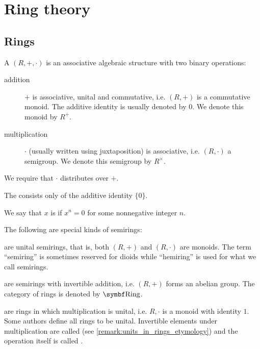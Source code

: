 \section{Ring theory}\label{sec:ring_theory}
\subsection{Rings}\label{subsec:rings}

\begin{definition}\label{def:semiring}
  A  \( (R, +, \cdot) \) is an associative algebraic structure with two binary operations:
  \begin{description}
    \item[addition] \( + \) is associative, unital and commutative, i.e. \( (R, +) \) is a commutative monoid. The additive identity is usually denoted by \( 0 \). We denote this monoid by \( R^+ \).

    \item[multiplication] \( \cdot \) (usually written using juxtaposition) is associative, i.e. \( (R, \cdot) \) a semigroup. We denote this semigroup by \( R^\times \).
  \end{description}

  We require that \( \cdot \) distributes over \( + \).

  The  consists only of the additive identity \( \{ 0 \} \).

  We say that \( x \) is  if \( x^n = 0 \) for some nonnegative integer \( n \).

  The following are special kinds of semirings:
  \begin{defenum}
      are unital semirings, that is, both \( (R, +) \) and \( (R, \cdot) \) are monoids. The term \enquote{semiring} is sometimes reserved for dioids while \enquote{hemiring} is used for what we call semirings.

      are semirings with invertible addition, i.e. \( (R, +) \) forms an abelian group. The category of rings is denoted by \( \Cat{Ring} \).

      are rings in which multiplication is unital, i.e. \( R, \cdot \) is a monoid with identity \( 1 \). Some authors define all rings to be unital. Invertible elements under multiplication are called  (see \cref{remark:units_in_rings_etymology}) and the operation itself is called .


\end{defenum}
\end{definition}
